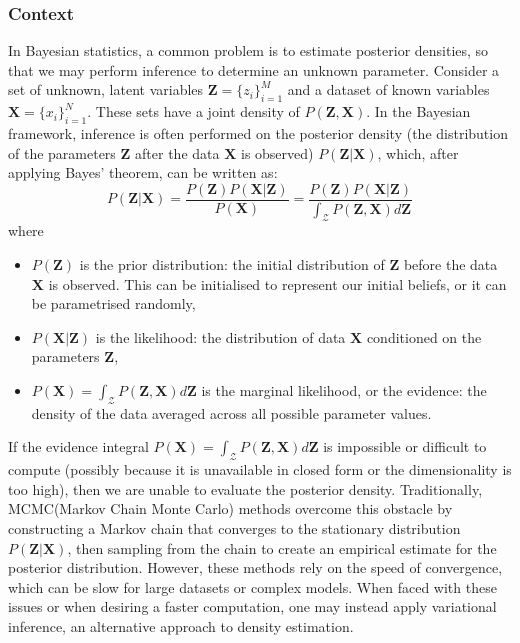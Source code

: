 \documentclass[a4paper,12pt]{article}
\begin{document}
\subsubsection{Context}
In Bayesian statistics, a common problem is to estimate posterior densities, so that we may perform inference to determine an unknown parameter. Consider a set of unknown, latent variables $\textbf{Z}=\{z_i\}^M_{i=1}$ and a dataset of known variables $\textbf{X}=\{x_i\}^N_{i=1}$. These sets have a joint density of $P(\textbf{Z},\textbf{X})$. In the Bayesian framework, inference is often performed on the posterior density (the distribution of the parameters $\textbf{Z}$ after the data $\textbf{X}$ is observed)
$P(\textbf{Z}|\textbf{X})$, which, after applying Bayes' theorem, can be written as:
\begin{equation*}P(\textbf{Z}|\textbf{X})=\frac{P(\textbf{Z})P(\textbf{X}|\textbf{Z})}{P(\textbf{X})}= \frac{P(\textbf{Z})P(\textbf{X}|\textbf{Z})}{\int_\mathcal{Z}P(\textbf{Z},\textbf{X})d\textbf{Z}}\end{equation*}
where
\begin{itemize}
\item $P(\textbf{Z})$ is the prior distribution: the initial distribution of $\textbf{Z}$ before the data $\textbf{X}$ is observed. This can be initialised to represent our initial beliefs, or it can be parametrised randomly,
\item $P(\textbf{X}|\textbf{Z})$ is the likelihood: the distribution of data $\textbf{X}$ conditioned on the parameters $\textbf{Z}$,
\item $P(\textbf{X})=\int_\mathcal{Z}P(\textbf{Z},\textbf{X})d\textbf{Z}$ is the marginal likelihood, or the evidence: the density of the data averaged across all possible parameter values.
\end{itemize}
If the evidence integral $P(\textbf{X})=\int_\mathcal{Z}P(\textbf{Z},\textbf{X})d\textbf{Z}$ is impossible or difficult to compute (possibly because it is unavailable in closed form or the dimensionality is too high), then we are unable to evaluate the posterior density. Traditionally, MCMC(Markov Chain Monte Carlo) methods overcome this obstacle by constructing a Markov chain that converges to the stationary distribution $P(\textbf{Z}|\textbf{X})$, then sampling from the chain to create an empirical estimate for the posterior distribution. However, these methods rely on the speed of convergence, which can be slow for large datasets or complex models. When faced with these issues or when desiring a faster computation, one may instead apply variational inference, an alternative approach to density estimation.
\end{document}
